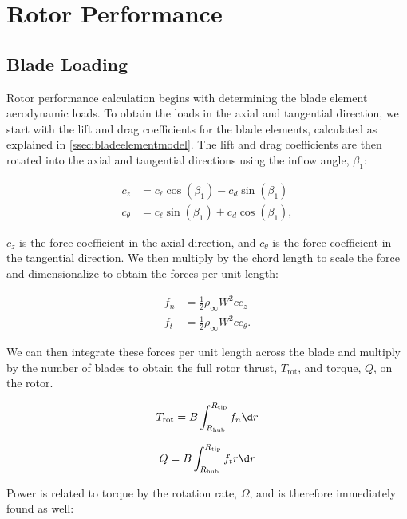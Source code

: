 \section{Rotor Performance}
\label{sec:rotorperformance}

\subsection{Blade Loading}

Rotor performance calculation begins with determining the blade element aerodynamic loads.
%
To obtain the loads in the axial and tangential direction, we start with the lift and drag coefficients for the blade elements, calculated as explained in \cref{ssec:bladeelementmodel}.
%
The lift and drag coefficients are then rotated into the axial and tangential directions using the inflow angle, \(\beta_1\):

\begin{align}
    c_z &= c_\ell \cos(\beta_1) - c_d \sin(\beta_1) \\
    c_\theta &= c_\ell \sin(\beta_1) + c_d \cos(\beta_1),
\end{align}

\where \(c_z\) is the force coefficient in the axial direction, and \(c_\theta\) is the force coefficient in the tangential direction.
%
We then multiply by the chord length to scale the force and dimensionalize to obtain the forces per unit length:

\begin{align}
    f_n &= \frac{1}{2} \rho_\infty W^2 c c_z \\
    f_t &= \frac{1}{2} \rho_\infty W^2 c c_\theta.
\end{align}

\noindent We can then integrate these forces per unit length across the blade and multiply by the number of blades to obtain the full rotor thrust, \(T_\text{rot}\), and torque, \(Q\), on the rotor.

\begin{equation}
    T_\text{rot} = B \int_{R_\text{hub}}^{R_\text{tip}} f_n \d r
\end{equation}

\begin{equation}
    Q = B \int_{R_\text{hub}}^{R_\text{tip}} f_t r \d r
\end{equation}

\noindent Power is related to torque by the rotation rate, \(\Omega\), and is therefore immediately found as well:

